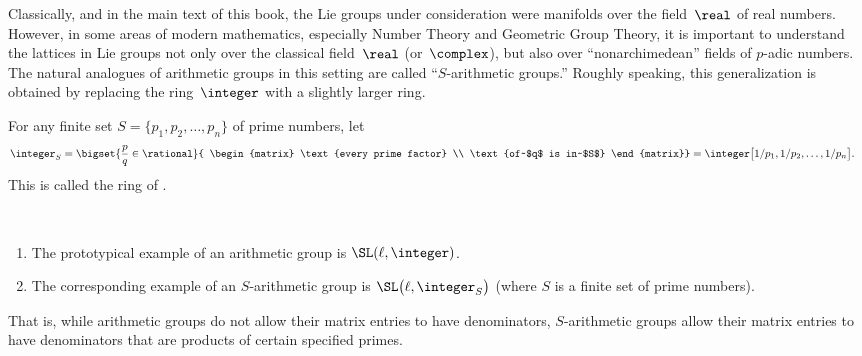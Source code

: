 



\standassumpfalse

\label{SarithChap}

Classically, and in the main text of this book, the Lie groups under consideration were manifolds over the field~$\real$ of real numbers. However, in some areas of modern mathematics, especially Number Theory and Geometric Group Theory, it is important to understand the lattices in Lie groups not only over the classical field~$\real$ (or~$\complex$), but also over ``nonarchimedean'' fields of $p$-adic numbers. The natural analogues of arithmetic groups in this setting are called ``$S$-arithmetic groups\zz.'' Roughly speaking, this generalization is obtained by replacing the ring~$\integer$ with a slightly larger ring.

\begin{defn}
For any finite set $S = \{p_1,p_2,\ldots,p_n\}$ of prime numbers, let%
	\begin{align*}
	\integer_S 
	&= \bigset{ \frac{p}{q} \in \rational }{ 
		\begin{matrix}
		\text{every prime factor} \\
		\text{of~$q$ is in~$S$} 
		\end{matrix}} 
	 =  \integer \bigl[ 1/p_1, 1/p_2, \ldots, 1/p_n \bigr]
	. \end{align*}
This is called the ring of .
\end{defn}

\begin{eg} \label{SArithPrototype} \ 
\noprelistbreak
	\begin{enumerate}
	\item The prototypical example of an arithmetic group is $\SL(\ell, \integer)$.
	\item The corresponding example of an $S$-arithmetic group is $\SL \bigl( \ell, \integer_S \bigr)$ (where $S$ is a finite set of prime numbers).
	\end{enumerate}
That is, while arithmetic groups do not allow their matrix entries to have denominators, $S$-arithmetic groups allow their matrix entries to have denominators that are products of certain specified primes.
\end{eg}

